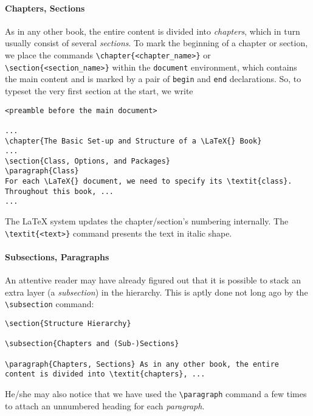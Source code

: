 \paragraph{Chapters, Sections} As in any other book, the entire content is divided into \textit{chapters}, which in turn usually consist of several \textit{sections}. To mark the beginning of a chapter or section, we place the commands \texttt{\textbackslash chapter\{<chapter\_name>\}} or \texttt{\textbackslash section\{<section\_name>\}} within the \verb|document| environment, which contains the main content and is marked by a pair of \verb|begin| and \verb|end| declarations. So, to typeset the very first section at the start, we write
\begin{lstlisting}
<preamble before the main document>

...
\chapter{The Basic Set-up and Structure of a \LaTeX{} Book}
...
\section{Class, Options, and Packages}
\paragraph{Class}
For each \LaTeX{} document, we need to specify its \textit{class}. Throughout this book, ...
...

\end{lstlisting}
The \LaTeX{} system updates the chapter/section's numbering internally. The \texttt{\textbackslash textit\{<text>\}} command presents the text in italic shape.

\paragraph{Subsections, Paragraphs} An attentive reader may have already figured out that it is possible to stack an extra layer (a \textit{subsection}) in the hierarchy. This is aptly done not long ago by the \texttt{\textbackslash subsection} command:
\begin{lstlisting}
\section{Structure Hierarchy}

\subsection{Chapters and (Sub-)Sections}

\paragraph{Chapters, Sections} As in any other book, the entire content is divided into \textit{chapters}, ...
\end{lstlisting}
He/she may also notice that we have used the \texttt{\textbackslash paragraph} command a few times to attach an unnumbered heading for each \textit{paragraph}.


